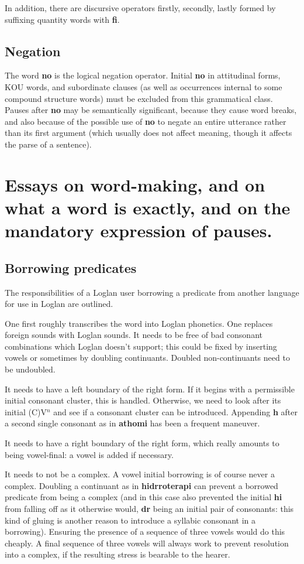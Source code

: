 \documentclass[12pt]{book}
\begin{document}
{In addition, there are discursive operators firstly, secondly, lastly formed by suffixing quantity words with {\bf fi}.

\subsection{Negation}

The word {\bf no} is the logical negation operator.   Initial {\bf no} in attitudinal forms, KOU words, and subordinate clauses (as well as occurrences internal to some compound structure words) must be excluded from this grammatical class.  Pauses after {\bf no} may be semantically significant, because they cause word breaks, and also because of the possible use of {\bf no} to negate an entire utterance rather than its first argument (which usually does not affect meaning, though it affects the parse of a sentence).

\section{Essays on word-making, and on what a word is exactly, and on the mandatory expression of pauses.}

\subsection{Borrowing predicates}

The responsibilities of a Loglan user borrowing a predicate from another language for use in Loglan are outlined.

One first roughly transcribes the word into Loglan phonetics.  One replaces foreign sounds with Loglan sounds.
It needs to be free of bad consonant combinations which Loglan doesn't support; this could be fixed by inserting vowels or sometimes by doubling continuants.   Doubled non-continuants need to be undoubled.

It needs to have a left boundary of the right form.  If it begins with a permissible initial consonant cluster, this is handled.  Otherwise, we need to look after its initial (C)V$^n$ and see if
a consonant cluster can be introduced.  Appending {\bf h} after a  second single consonant as in {\bf athomi} has been a frequent maneuver.

It needs to have a right boundary of the right form, which really amounts to being vowel-final:  a vowel is added if necessary.

It needs to not be a complex.  A vowel initial borrowing is of course never a complex.  Doubling a continuant as in {\bf hidrroterapi} can prevent a borrowed predicate from being a complex (and in this case also prevented the initial {\bf hi} from falling off as it otherwise would, {\bf dr} being an initial pair of consonants:  this kind of gluing is another reason to introduce a syllabic consonant in a borrowing).  Ensuring the presence of a sequence of three vowels would  do this cheaply.  A final sequence of three vowels will always work to prevent resolution into a complex, if the resulting stress is bearable to the hearer.

}
\end{document}
